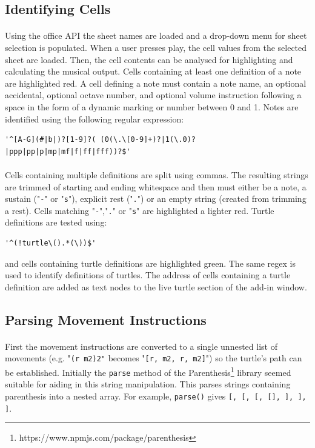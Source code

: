 \subsection{Identifying Cells}

\paragraph{} Using the office API the sheet names are loaded and a drop-down menu for sheet selection is populated. When a user presses play, the cell values from the selected sheet are loaded. Then, the cell contents can be analysed for highlighting and calculating the musical output. Cells containing at least one definition of a note are highlighted red. A cell defining a note must contain a note name, an optional accidental, optional octave number, and optional volume instruction following a space in the form of a dynamic marking or number between 0 and 1. Notes are identified using the following regular expression:

\begin{verbatim}
'^[A-G](#|b|)?[1-9]?( (0(\.\[0-9]+)?|1(\.0)?|ppp|pp|p|mp|mf|f|ff|fff))?$'
\end{verbatim}

\paragraph{} Cells containing multiple definitions are split using commas. The resulting strings are trimmed of starting and ending whitespace and then must either be a note, a sustain ("\texttt{-}" or "\texttt{s}"), explicit rest ("\texttt{.}") or an empty string (created from trimming a rest). Cells matching "\texttt{-}","\texttt{.}" or "\texttt{s}" are highlighted a lighter red. Turtle definitions are tested using:
\begin{verbatim}
'^(!turtle\().*(\))$'
\end{verbatim}
and cells containing turtle definitions are highlighted green. The same regex is used to identify definitions of turtles. The address of cells containing a turtle definition are added as text nodes to the live turtle section of the add-in window.

\subsection{Parsing Movement Instructions}

\paragraph{} First the movement instructions are converted to a single unnested list of movements (e.g. "\texttt{(r m2)2"} becomes "\texttt{[r, m2, r, m2]}") so the turtle's path can be established. Initially  the \texttt{parse} method of the Parenthesis\footnote{https://www.npmjs.com/package/parenthesis} library seemed suitable for aiding in this string manipulation. This parses strings containing parenthesis into a nested array. For example, \texttt{parse()} gives \texttt{[, [\upquote{b[}, [, [], \upquote{\}}], \upquote{]}], \upquote{)}]}.

